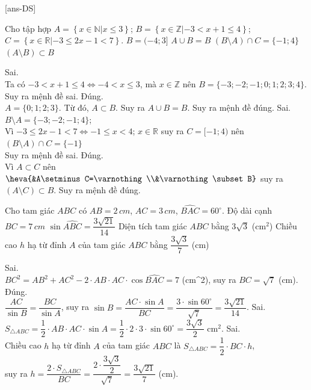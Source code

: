 [ans-DS]

\begin{ex}%
	Cho tập hợp $A=\left\{x\in\mathbb{N}|x\leq 3\right\}$; $B=\left\{x\in \mathbb{Z}|-3<x+1\leq 4\right\}$;
	$C=\left\{x\in \mathbb{R}|-3\leq 2x-1<7\right\}$.
	\choiceTF
	{$B=(-4;3]$}
	{\True $A\cup B=B$}
	{$(B\setminus A)\cap C=\{-1;4\}$}
	{\True $(A\setminus B)\subset B$}
	\loigiai
	{
		\begin{itemchoice}
			\itemch Sai. \\
			Ta có $-3<x+1\leq 4 \Leftrightarrow -4 <x\leq 3$, mà $x \in\mathbb{Z}$ nên $B=\{-3;-2;-1;0;1;2;3;4\}$. Suy ra mệnh đề sai.
			\itemch Đúng.\\
			$A=\{0;1;2;3\}$. Từ đó, $A \subset B$. Suy ra $A\cup B=B$. Suy ra mệnh đề đúng.
			\itemch Sai.\\
			$ B\setminus A=\{-3;-2;-1;4\}$;\\
			Vì $-3\leq 2x-1<7 \Leftrightarrow -1\leq x<4$; $x\in \mathbb{R}$ suy ra $C=[-1;4)$ nên $(B\setminus A)\cap C=\{-1\}$\\
			Suy ra mệnh đề sai.
			\itemch Đúng.\\
			Vì $A\subset C$ nên $\heva{&A\setminus C=\varnothing \\&\varnothing \subset B}$ suy ra $(A\setminus C) \subset B$. Suy ra mệnh đề đúng.
		\end{itemchoice}
	}
\end{ex}

\begin{ex}%
	Cho tam giác $ABC$ có $AB=2\,cm$, $AC=3\,cm$, $\widehat{BAC}=60^{\circ}$.
	\choiceTF
	{Độ dài cạnh $BC=7\,cm$}
	{\True $\sin \widehat{ABC}=\dfrac{3\sqrt{21}}{14}$}
	{Diện tích tam giác $ABC$ bằng $3\sqrt{3}$ (cm$^2$)}
	{Chiều cao $h$ hạ từ đỉnh $A$ của tam giác $ABC$ bằng $\dfrac{3\sqrt{3}}{7}$ (cm)}
	\loigiai
	{
		\begin{itemchoice}
			\itemch Sai. \\
			$BC^2=AB^2+AC^2-2\cdot AB\cdot AC\cdot \cos\widehat{BAC}=7$ (cm^2), suy ra $BC=\sqrt{7}$ (cm).
			\itemch Đúng.\\
			$\dfrac{AC}{\sin B}=\dfrac{BC}{\sin A}$, suy ra $\sin B=\dfrac{AC\cdot \sin A}{BC}=\dfrac{3\cdot \sin 60^{\circ}}{\sqrt{7}}=\dfrac{3\sqrt{21}}{14}$.
			\itemch Sai.\\
			$S_{\triangle ABC}=\dfrac{1}{2}\cdot AB\cdot AC\cdot \sin A=\dfrac{1}{2}\cdot 2\cdot 3\cdot \sin 60^{\circ}=\dfrac{3\sqrt{3}}{2}$ cm$^2$.
			\itemch Sai.\\
			Chiều cao $h$ hạ từ đỉnh $A$ của tam giác $ABC$ là $S_{\triangle ABC}=\dfrac{1}{2}\cdot BC\cdot h$,\\ suy ra $h=\dfrac{2\cdot S_{\triangle ABC}}{BC}=\dfrac{2\cdot \dfrac{3\sqrt{3}}{2}}{\sqrt{7}}=\dfrac{3\sqrt{21}}{7}$ (cm).
		\end{itemchoice}
	}
\end{ex}


